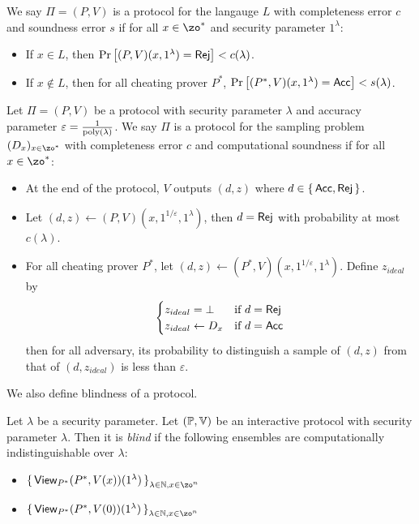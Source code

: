 \begin{definition}
	We say $\Pi=(P, V)$ is a protocol for the langauge $L$ with completeness error $c$ and soundness error $s$ if for all $x\in\zo^*$ and security parameter $1^\lambda$:
	\begin{itemize}
		\item If $x\in L$, then $\Pr\left[(P, V)(x, 1^\lambda)=\mathsf{Rej}\right]<c(\lambda)$.
		\item If $x\notin L$, then for all cheating prover $P^*$, $\Pr\left[(P^*, V)(x, 1^\lambda)=\mathsf{Acc}\right]<s(\lambda)$.
	\end{itemize}
\end{definition}

\begin{definition}
	Let $\Pi=(P, V)$ be a protocol with security parameter $\lambda$ and accuracy parameter $\varepsilon=\frac{1}{\operatorname*{\operatorname{poly}}(\lambda)}$.
	We say $\Pi$ is a protocol for the sampling problem $(D_x)_{x\in\zo^*}$ with completeness error $c$ and computational soundness  if for all $x\in\zo^*$:
	\begin{itemize}
		\item At the end of the protocol, $V$ outputs $(d, z)$ where $d\in\set{\mathsf{Acc}, \mathsf{Rej}}$.
		\item Let $(d, z)\leftarrow(P, V)(x, 1^{1/\varepsilon}, 1^\lambda)$, then $d=\mathsf{Rej}$ with probability at most $c(\lambda)$.
		\item For all cheating prover $P^*$, let $(d, z)\leftarrow(P^*, V)(x, 1^{1/\varepsilon}, 1^\lambda)$.
			Define $z_{ideal}$ by
			$$\begin{cases}
				z_{ideal}=\bot & \text{if } d=\mathsf{Rej}\\
				z_{ideal}\leftarrow D_x & \text{if } d=\mathsf{Acc}
			\end{cases}$$
			then for all adversary, its probability to distinguish a sample of $(d, z)$ from that of $(d, z_{ideal})$ is less than $\varepsilon$.
	\end{itemize}  
\end{definition}

We also define blindness of a protocol.

\begin{definition}
	Let $\lambda$ be a security parameter.
	Let $(\mathbb{P}, \mathbb{V})$ be an interactive protocol with security parameter $\lambda$.
	Then it is \emph{blind} if the following ensembles are computationally indistinguishable over $\lambda$:
	\begin{itemize}
		\item $\set{\View_{P^*}(P^*, V(x))(1^\lambda)}_{\lambda\in\bbN, x\in\zo^n}$
		\item $\set{\View_{P^*}(P^*, V(0))(1^\lambda)}_{\lambda\in\bbN, x\in\zo^n}$
	\end{itemize}
\end{definition}

